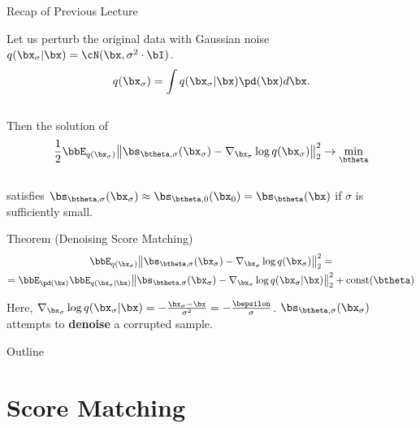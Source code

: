 \documentclass{beamer}
\begin{document}
\begin{frame}{Recap of Previous Lecture}

    Let us perturb the original data with Gaussian noise $q(\bx_{\sigma} | \bx) = \cN(\bx, \sigma^2 \cdot \bI)$.
    \vspace{-0.3cm}
    \[
        q(\bx_{\sigma}) = \int q(\bx_{\sigma} | \bx) \pd(\bx) d\bx.
    \]
    \vspace{-0.6cm} \\
    Then the solution of 
    \vspace{-0.2cm}
    \[
        \frac{1}{2} \bbE_{q(\bx_{\sigma})}\bigl\| \bs_{\btheta, \sigma}(\bx_{\sigma}) - \nabla_{\bx_{\sigma}} \log q(\bx_{\sigma}) \bigr\|^2_2 \rightarrow \min_{\btheta}
    \]
    \vspace{-0.5cm} \\
    satisfies $\bs_{\btheta, \sigma}(\bx_{\sigma}) \approx \bs_{\btheta, 0}(\bx_0) = \bs_{\btheta}(\bx)$ if $\sigma$ is sufficiently small.
    \begin{block}{Theorem (Denoising Score Matching)}
        \vspace{-0.8cm}
        \begin{multline*}
            \bbE_{q(\bx_{\sigma})}\bigl\| \bs_{\btheta, \sigma}(\bx_{\sigma}) - \nabla_{\bx_{\sigma}} \log q(\bx_{\sigma}) \bigr\|^2_2 = \\ = \bbE_{\pd(\bx)} \bbE_{q(\bx_{\sigma} | \bx)}\bigl\| \bs_{\btheta, \sigma}(\bx_{\sigma}) - \nabla_{\bx_{\sigma}} \log q(\bx_{\sigma} | \bx) \bigr\|^2_2 + \text{const}(\btheta)
        \end{multline*}
        \vspace{-0.7cm}
    \end{block}
    Here, $\nabla_{\bx_{\sigma}} \log q(\bx_{\sigma} | \bx) = - \frac{\bx_{\sigma} - \bx}{\sigma^2} = - \frac{\bepsilon}{\sigma}$. $\bs_{\btheta, \sigma}(\bx_{\sigma})$ attempts to \textbf{denoise} a corrupted sample.
\end{frame}
\begin{frame}{Outline}
	\tableofcontents
\end{frame}
\section{Score Matching}
\end{document}
